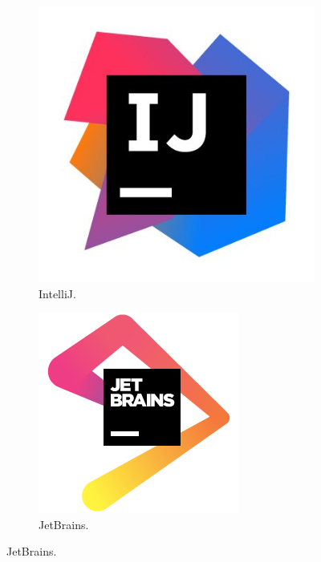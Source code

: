 \documentclass{report}
\begin{document}
\begin{figure}[!h]
		\centering
    \begin{subfigure}[b]{0.2\textwidth}
        \includegraphics[width=\textwidth]{img/intellij.jpg}
        \caption{IntelliJ.}
    \end{subfigure}
    \begin{subfigure}[b]{0.2\textwidth}
        \includegraphics[width=\textwidth]{img/jetbrains.png}
        \caption{JetBrains.}
    \end{subfigure}
\end{figure}
\end{document}
